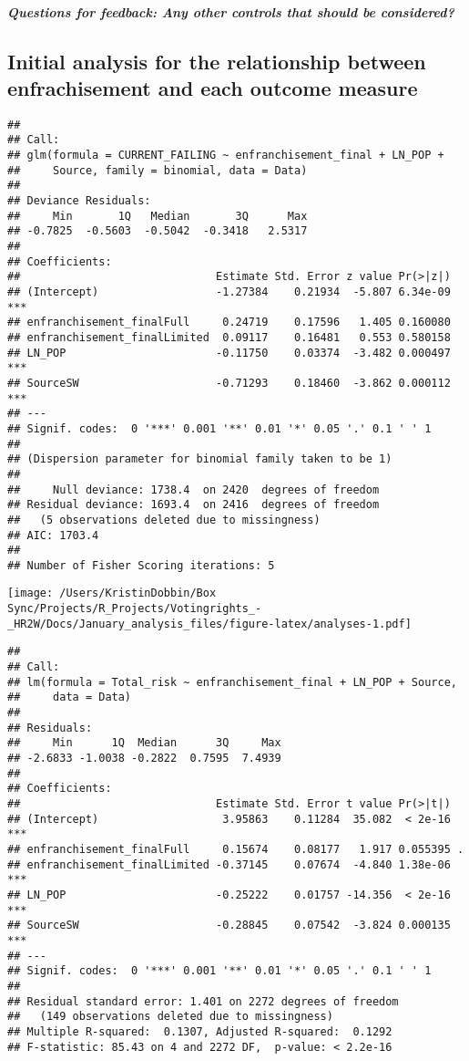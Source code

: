 \documentclass[
]{article}
\begin{document}
\hypertarget{questions-for-feedback-any-other-controls-that-should-be-considered}{%
\subparagraph{Questions for feedback: Any other controls that should be
considered?}\label{questions-for-feedback-any-other-controls-that-should-be-considered}}

\hypertarget{initial-analysis-for-the-relationship-between-enfrachisement-and-each-outcome-measure}{%
\subsection{Initial analysis for the relationship between enfrachisement
and each outcome
measure}\label{initial-analysis-for-the-relationship-between-enfrachisement-and-each-outcome-measure}}

\begin{verbatim}
## 
## Call:
## glm(formula = CURRENT_FAILING ~ enfranchisement_final + LN_POP + 
##     Source, family = binomial, data = Data)
## 
## Deviance Residuals: 
##     Min       1Q   Median       3Q      Max  
## -0.7825  -0.5603  -0.5042  -0.3418   2.5317  
## 
## Coefficients:
##                              Estimate Std. Error z value Pr(>|z|)    
## (Intercept)                  -1.27384    0.21934  -5.807 6.34e-09 ***
## enfranchisement_finalFull     0.24719    0.17596   1.405 0.160080    
## enfranchisement_finalLimited  0.09117    0.16481   0.553 0.580158    
## LN_POP                       -0.11750    0.03374  -3.482 0.000497 ***
## SourceSW                     -0.71293    0.18460  -3.862 0.000112 ***
## ---
## Signif. codes:  0 '***' 0.001 '**' 0.01 '*' 0.05 '.' 0.1 ' ' 1
## 
## (Dispersion parameter for binomial family taken to be 1)
## 
##     Null deviance: 1738.4  on 2420  degrees of freedom
## Residual deviance: 1693.4  on 2416  degrees of freedom
##   (5 observations deleted due to missingness)
## AIC: 1703.4
## 
## Number of Fisher Scoring iterations: 5
\end{verbatim}

\texttt{[image: /Users/KristinDobbin/Box Sync/Projects/R\_Projects/Votingrights\_-\_HR2W/Docs/January\_analysis\_files/figure-latex/analyses-1.pdf]}

\begin{verbatim}
## 
## Call:
## lm(formula = Total_risk ~ enfranchisement_final + LN_POP + Source, 
##     data = Data)
## 
## Residuals:
##     Min      1Q  Median      3Q     Max 
## -2.6833 -1.0038 -0.2822  0.7595  7.4939 
## 
## Coefficients:
##                              Estimate Std. Error t value Pr(>|t|)    
## (Intercept)                   3.95863    0.11284  35.082  < 2e-16 ***
## enfranchisement_finalFull     0.15674    0.08177   1.917 0.055395 .  
## enfranchisement_finalLimited -0.37145    0.07674  -4.840 1.38e-06 ***
## LN_POP                       -0.25222    0.01757 -14.356  < 2e-16 ***
## SourceSW                     -0.28845    0.07542  -3.824 0.000135 ***
## ---
## Signif. codes:  0 '***' 0.001 '**' 0.01 '*' 0.05 '.' 0.1 ' ' 1
## 
## Residual standard error: 1.401 on 2272 degrees of freedom
##   (149 observations deleted due to missingness)
## Multiple R-squared:  0.1307, Adjusted R-squared:  0.1292 
## F-statistic: 85.43 on 4 and 2272 DF,  p-value: < 2.2e-16
\end{verbatim}
\end{document}
